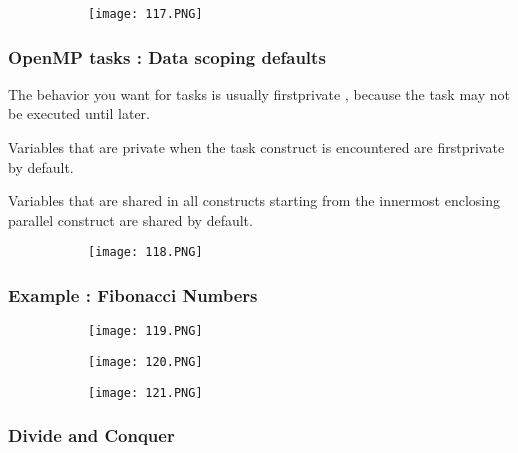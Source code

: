 \documentclass{article}
\begin{document}
\begin{figure}[ht!]
  \centering
  \begin{subfigure}[b]{0.5\linewidth}
    \texttt{[image: 117.PNG]}
  \end{subfigure}
\end{figure}

\subsubsection{OpenMP tasks : Data scoping defaults}

The behavior you want for tasks is usually firstprivate , because the task may not be executed until later.

Variables that are private when the task construct is encountered are firstprivate by default.

Variables that are shared in all constructs starting from the innermost enclosing parallel construct are shared by default.

\begin{figure}[ht!]
  \centering
  \begin{subfigure}[b]{0.5\linewidth}
    \texttt{[image: 118.PNG]}
  \end{subfigure}
\end{figure}

\subsubsection{Example : Fibonacci Numbers}

\begin{figure}[ht!]
  \centering
  \begin{subfigure}[b]{0.5\linewidth}
    \texttt{[image: 119.PNG]}
  \end{subfigure}
     \begin{subfigure}[b]{0.49\textwidth}
         \centering
         \texttt{[image: 120.PNG]}
     \end{subfigure}
\end{figure}

\begin{figure}[ht!]
  \centering
  \begin{subfigure}[b]{0.5\linewidth}
    \texttt{[image: 121.PNG]}
  \end{subfigure}
\end{figure}

\subsubsection{Divide and Conquer}
\end{document}
